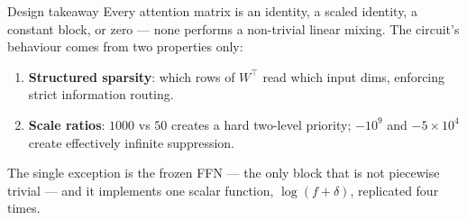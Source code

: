 \documentclass[11pt]{article}
\begin{document}
\begin{warningbox}{Design takeaway}
Every attention matrix is an identity, a scaled identity, a constant block, or zero --- none
performs a non-trivial linear mixing. The circuit's behaviour comes from two properties only:
\begin{enumerate}
\item \textbf{Structured sparsity}: which rows of $W^\top$ read which input dims, enforcing strict
information routing.
\item \textbf{Scale ratios}: $1000$ vs $50$ creates a hard two-level priority; $-10^9$ and
$-5\times10^4$ create effectively infinite suppression.
\end{enumerate}
The single exception is the frozen FFN --- the only block that is not piecewise trivial --- and it
implements one scalar function, $\log(f+\delta)$, replicated four times.
\end{warningbox}
\end{document}
